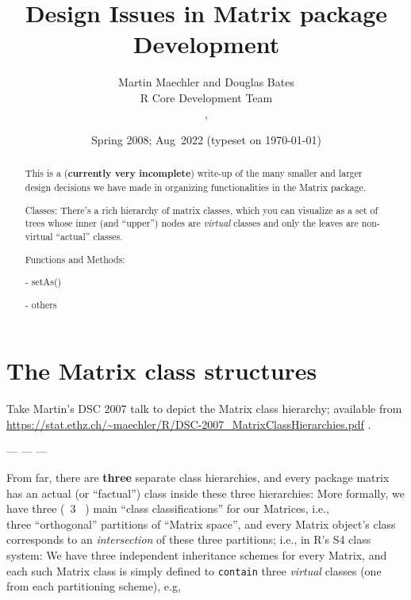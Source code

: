 \documentclass{article}
\title{Design Issues in Matrix package Development}
\author{Martin Maechler and Douglas Bates\\R Core Development Team
  \\\email{maechler@stat.math.ethz.ch}, \email{bates@r-project.org}}
\date{Spring 2008; Aug~2022 ({\tiny typeset on \tiny\today})}
\begin{document}

\maketitle
\begin{abstract}
This is a (\textbf{currently very incomplete}) write-up of the many smaller and
larger design decisions we have made in organizing functionalities in the
Matrix package.

Classes: There's a rich hierarchy of matrix classes, which you can
visualize as a set of trees whose inner (and ``upper'') nodes are
\emph{virtual} classes and only the leaves are non-virtual ``actual'' classes.

Functions and Methods:

- setAs()

- others

\end{abstract}

\section{The Matrix class structures}
\label{sec:classes}

Take Martin's DSC 2007 talk to depict the Matrix class hierarchy;
available from {\small
  \url{https://stat.ethz.ch/~maechler/R/DSC-2007_MatrixClassHierarchies.pdf}} .

 --- --- --- %

From far, there are \textbf{three} separate class hierarchies, and every  package
matrix has an actual (or ``factual'') class inside these three hierarchies:
More formally, we have three (\ 3 \ ) main ``class classifications'' for our Matrices, i.e.,\\
three ``orthogonal'' partitions of  ``Matrix space'', and every Matrix
object's class corresponds to an \emph{intersection} of these three partitions;
i.e., in R's S4 class system: We have three independent inheritance
schemes for every Matrix, and each such Matrix class is simply defined to
\texttt{contain} three \emph{virtual} classes (one from each partitioning
scheme), e.g,
\end{document}
